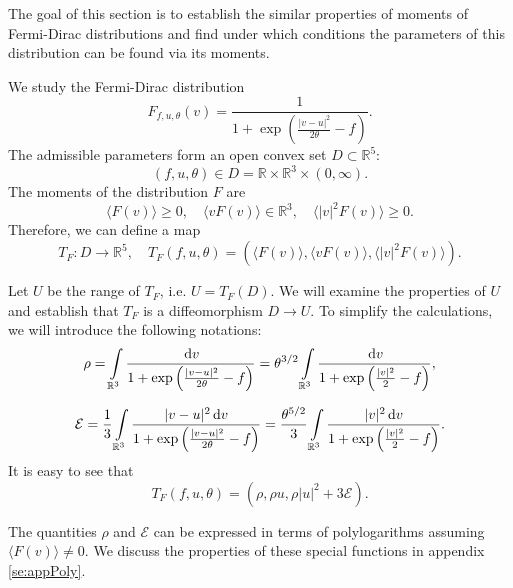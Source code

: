 The goal of this section is to establish the similar properties of moments of Fermi-Dirac distributions and find under which conditions the parameters of this distribution can be found via its moments. 

We study the Fermi-Dirac distribution \[F_{f,  u,\theta}(v)=\frac{1}{1+\exp\left(\frac{|v-u|^2}{2\theta}-f\right)} .\] The admissible parameters form an open convex set $D \subset\mathbb R^5$: \[(f,  u,\theta)\in D= \mathbb R\times \mathbb R^3\times (0,\infty).\]
 The moments of the distribution $F$ are
\[\langle F(v)\rangle\ge 0,\quad \langle vF(v)\rangle\in\mathbb R^3, \quad\langle |v|^2F(v)\rangle\ge 0. \]
Therefore, we can define a map 
\[T_F:D\to \mathbb R^5, \quad T_F(f,  u,\theta) = \left(\langle F(v)\rangle, \langle vF(v)\rangle, \langle |v|^2F(v)\rangle\right).\]

Let $U$ be the range of $T_F$, i.e. $U=T_F(D)$. We will examine the properties of $U$ and establish that $T_F$ is a diffeomorphism $D\to U$. To simplify the calculations, we will introduce the following notations:
\begin{equation}\label{eq:rho}\rho = \int\limits_{\mathbb R^3} \frac{{\,\mathrm{d} v}}{1+\exp\left(\frac{|v-u|^2}{2\theta}-f\right)} =  \theta^{3/2}\int\limits_{\mathbb R^3} \frac{{\,\mathrm{d} v}}{1+\exp\left(\frac{|v|^2}{2}-f\right)}, \end{equation}

\begin{equation}\label{eq:E}
\mathcal E = \frac 13\int\limits_{\mathbb R^3} \frac{|v-u|^2{\,\mathrm{d} v}}{1+\exp\left(\frac{|v-u|^2}{2\theta}-f\right)} = \frac{\theta^{5/2}}{3}\int\limits_{{\mathbb {R}^3}} \frac{|v |^2{\,\mathrm{d} v}}{1+\exp\left(\frac{|v |^2}{2 }-f\right)}.
\end{equation}
It is easy to see that \[T_F(f, u,\theta) = (\rho,\rho u, \rho |u|^2+3  \mathcal E).\]

The quantities $\rho$ and $\mathcal E$ can be expressed in terms of polylogarithms assuming $\langle F(v)\rangle\ne0$. We discuss the properties of these special functions in appendix \ref{se:appPoly}. 

